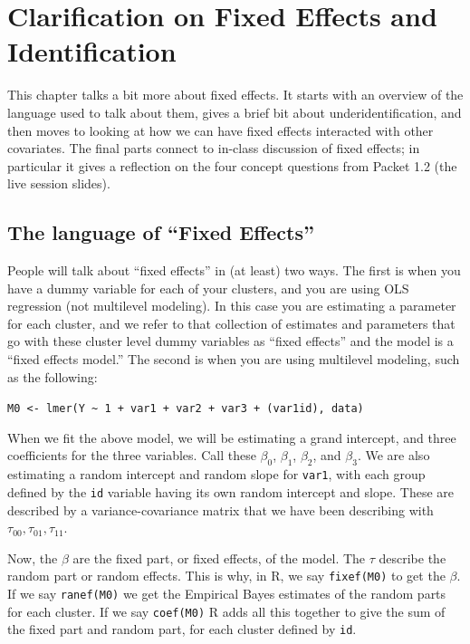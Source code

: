 \documentclass[
  letterpaper,
  DIV=11,
  numbers=noendperiod]{scrreprt}
\begin{document}
\chapter{Clarification on Fixed Effects and
Identification}\label{clarification-on-fixed-effects-and-identification}

This chapter talks a bit more about fixed effects. It starts with an
overview of the language used to talk about them, gives a brief bit
about underidentification, and then moves to looking at how we can have
fixed effects interacted with other covariates. The final parts connect
to in-class discussion of fixed effects; in particular it gives a
reflection on the four concept questions from Packet 1.2 (the live
session slides).

\section{The language of ``Fixed
Effects''}\label{the-language-of-fixed-effects}

People will talk about ``fixed effects'' in (at least) two ways. The
first is when you have a dummy variable for each of your clusters, and
you are using OLS regression (not multilevel modeling). In this case you
are estimating a parameter for each cluster, and we refer to that
collection of estimates and parameters that go with these cluster level
dummy variables as ``fixed effects'' and the model is a ``fixed effects
model.'' The second is when you are using multilevel modeling, such as
the following:

\texttt{M0\ \textless{}-\ lmer(Y\ \textasciitilde{}\ 1\ +\ var1\ +\ var2\ +\ var3\ +\ (var1\textbar{}id),\ data)}

When we fit the above model, we will be estimating a grand intercept,
and three coefficients for the three variables. Call these \(\beta_0\),
\(\beta_1\), \(\beta_2\), and \(\beta_3\). We are also estimating a
random intercept and random slope for \texttt{var1}, with each group
defined by the \texttt{id} variable having its own random intercept and
slope. These are described by a variance-covariance matrix that we have
been describing with \(\tau_{00}, \tau_{01}, \tau_{11}\).

Now, the \(\beta\) are the fixed part, or fixed effects, of the model.
The \(\tau\) describe the random part or random effects. This is why, in
R, we say \texttt{fixef(M0)} to get the \(\beta\). If we say
\texttt{ranef(M0)} we get the Empirical Bayes estimates of the random
parts for each cluster. If we say \texttt{coef(M0)} R adds all this
together to give the sum of the fixed part and random part, for each
cluster defined by \texttt{id}.
\end{document}
